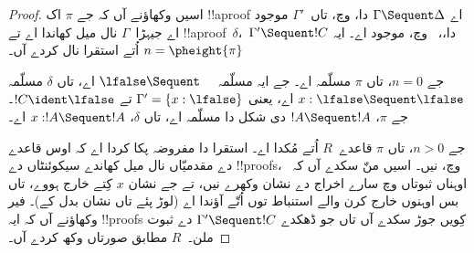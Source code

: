 \documentclass[../../../include/open-logic-section]{subfiles}
\begin{document}
\begin{proof}
اسیں وکھاؤنے آں کہ جے $\pi$ اک !!a{proof} اے $\Gamma \Sequent \Delta$ دا،  وچ، تاں~$\Gamma'$ موجود اے جیہڑا~$\Gamma$ نال میل کھاندا اے تے !!a{proof}~$\delta$،~$\Gamma' \Sequent !C$ دا،،~ وچ، موجود اے۔ ایہ $n = \pheight{\pi}$ اُتے استقرا نال کردے آں۔

جے $n = 0$، تاں $\pi$ مسلّمہ اے۔ جے ایہ مسلّمہ $\lfalse \Sequent
  \quad$ اے، تاں $\delta$ مسلّمہ $x:\lfalse \Sequent \lfalse$ اے، یعنی $\Gamma' = \{x:\lfalse\}$ تے $!C \ident \lfalse$۔ جے $\pi$، $!A \Sequent !A$ دی شکل دا مسلّمہ اے، تاں $\delta$، $x: !A \Sequent !A$ اے۔

جے $n>0$، تاں $\pi$ قاعدے~$R$ اُتے مُکدا اے۔ استقرا دا مفروضہ پکا کردا اے کہ اوس قاعدے دے مقدمیّاں نال میل کھاندے سیکوئنٹاں دے !!{proof}s،~ وچ، نیں۔ اسیں منّ سکدے آں کہ اوہناں ثبوتاں وچ سارے اخراج دے نشان وکھرے نیں، تے جے نشان $x$ کِتے خارج ہووے، تاں بس اوہنوں خارج کرن والے استنباط توں اُتّے آؤندا اے (لوڑ پئے تاں نشان بدل کے)۔ فیر وکھاؤنے آں کہ ایہ !!{proof}s کِویں جوڑ سکدے آں تاں جو ڈھکدے $\Gamma' \Sequent !C$ دے ثبوت ملن۔~$R$ مطابق صورتاں وکھ کردے آں۔


\end{proof}
\end{document}
